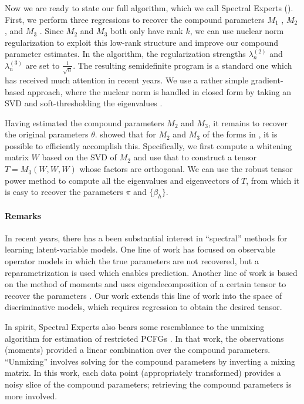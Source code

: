 Now we are ready to state our full algorithm, which we call Spectral Experts
().
First, we perform three regressions to recover the compound parameters
$M_1$ ,
$M_2$ , and
$M_3$ .
Since $M_2$ and $M_3$ both only have rank $k$,
we can use nuclear norm regularization
\cite{Tomioka2011,NegahbanWainwright2009}
to exploit this low-rank structure and improve our compound parameter estimates.
In the algorithm, the regularization strengths $\lambda_n^{(2)}$ and $\lambda_n^{(3)}$
are set to $\frac{1}{\sqrt{n}}$.
The resulting semidefinite program is a standard one which has received
much attention in recent years.
We use a rather simple gradient-based approach,
where the nuclear norm is handled in closed form by taking an SVD
and soft-thresholding the eigenvalues \cite{donoho95soft,cai10soft}.

Having estimated the compound parameters $M_2$ and $M_3$,
it remains to recover the original parameters $\theta$.
\citet{AnandkumarGeHsu2012} showed that for $M_2$ and $M_3$ of
the forms in , it is possible to efficiently accomplish this.
Specifically, we first compute a whitening matrix $W$ based on the SVD of $M_2$
and use that to construct a tensor $T = M_3(W, W, W)$ whose factors are orthogonal.
We can use the robust tensor power method to compute all the
eigenvalues and eigenvectors of $T$, from which it is easy to recover
the parameters $\pi$ and $\{\beta_h\}$.

\paragraph{Remarks}

In recent years, there has a been substantial interest in ``spectral'' methods
for learning latent-variable models.  One line of work has
focused on observable operator models \cite{hsu09spectral}
in which the true parameters are not recovered, but a reparametrization is used
which enables prediction.
Another line of work is based on the method of moments and uses eigendecomposition of a certain tensor
to recover the parameters \cite{anandkumar12moments,anandkumar12svd,AnandkumarHsuKakade2012}.
Our work extends this line of work into the space of discriminative models,
which requires regression to obtain the desired tensor.

In spirit, Spectral Experts also bears some resemblance to the unmixing
algorithm for estimation of restricted PCFGs
\cite{hsu12identifiability}.
In that work, the observations (moments) provided a linear combination over
the compound parameters.  ``Unmixing'' involves solving for the compound
parameters by inverting a mixing matrix.  In this work,
each data point (appropriately transformed) provides a noisy slice of the
compound parameters; retrieving the compound parameters is more involved.

